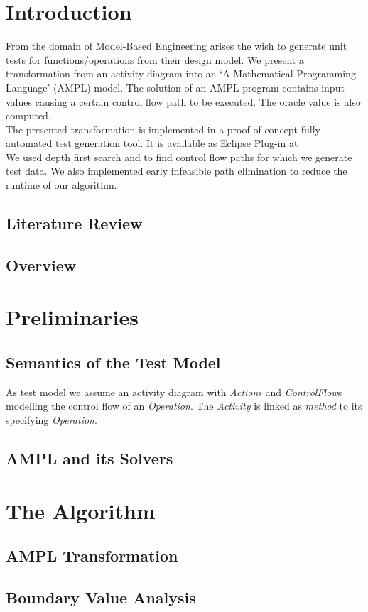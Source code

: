 \documentclass[runningheads,a4paper]{llncs}
\newcommand{\UMLType}[1]{\textsf{\textit{#1}}}
\newcommand{\UMLReference}[1]{\textsf{\textit{#1}}}
\begin{document}
\section{Introduction}
From the domain of Model-Based Engineering arises the wish to generate unit tests for functions/operations from their design model. We present a transformation from an activity diagram into an `A Mathematical Programming Language' (AMPL) model. The solution of an AMPL program contains input values causing a certain control flow path to be executed. The oracle value is also computed.\\
The presented transformation is implemented in a proof-of-concept fully automated test generation tool. It is available as Eclipse Plug-in at \cite{PartegWebsite}\\
We used depth first search and to find control flow paths for which we generate test data. We also implemented early infeasible path elimination to reduce the runtime of our algorithm.
\subsection{Literature Review}
\subsection{Overview}
\section{Preliminaries}
\subsection{Semantics of the Test Model}
As test model we assume an activity diagram with \UMLType{Action}s and \UMLType{ControlFlow}s modelling the control flow of an \UMLType{Operation}. The \UMLType{Activity} is linked as \UMLReference{method} to its specifying \UMLType{Operation}.
\subsection{AMPL and its Solvers}
\section{The Algorithm}
\subsection{AMPL Transformation}
\subsection{Boundary Value Analysis}
\end{document}

